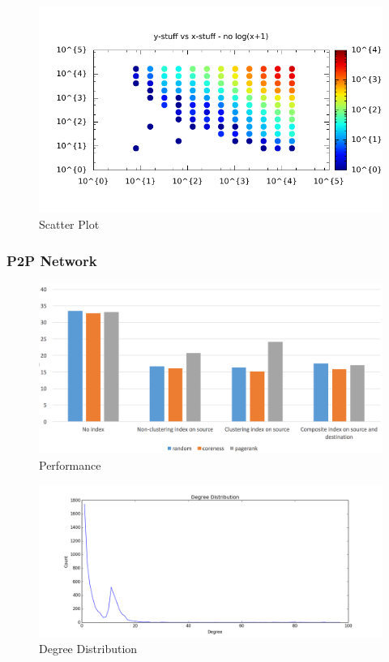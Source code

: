 \begin{figure}[H]
\centering
\includegraphics[width=0.8\linewidth]{ca_scatter}
\caption{Scatter Plot}
\end{figure}

\subsubsection{P2P Network}

\begin{figure}[H]
\centering
\includegraphics[width=0.8\linewidth]{p2p}
\caption{Performance}
\end{figure}

\begin{figure}[H]
\centering
\includegraphics[width=0.8\linewidth]{p2p_degree}
\caption{Degree Distribution}
\end{figure}

